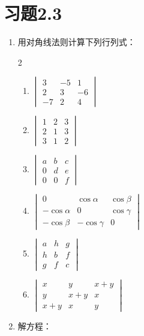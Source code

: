 \section*{习题2.3}
\begin{enumerate}
    \item 用对角线法则计算下列行列式：
\begin{multicols}{2}
\begin{enumerate}
    \item $\begin{vmatrix}3 & -5 & 1 \\ 2 & 3 & -6 \\ -7 & 2 & 4\end{vmatrix}$
    \item $\begin{vmatrix}1 & 2 & 3 \\ 2 & 1 & 3 \\ 3 & 1 & 2\end{vmatrix}$
    \item $\begin{vmatrix}a & b & c \\ 0 & d & e \\ 0 & 0 & f\end{vmatrix}$
    \item $\begin{vmatrix}0 & \cos \alpha & \cos \beta \\ -\cos \alpha & 0 & \cos \gamma \\ -\cos \beta & -\cos \gamma & 0\end{vmatrix}$
    \item $\begin{vmatrix}a & h & g \\ h & b & f \\ g & f & c\end{vmatrix}$
    \item $\begin{vmatrix}x & y & x+y \\ y & x+y & x \\ x+y & x & y\end{vmatrix}$
\end{enumerate}
\end{multicols}
    \item 解方程：
\begin{enumerate}
\end{enumerate}
\end{enumerate}
